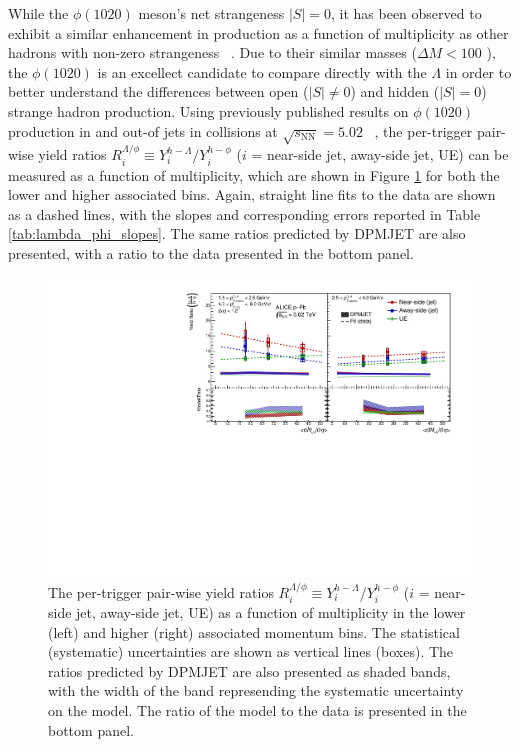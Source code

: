 While the $\phi(1020)$ meson's net strangeness $|S| = 0$, it has been observed to exhibit a similar enhancement in production as a function of multiplicity as other hadrons with non-zero strangeness ~\cite{PhiEnhancement}. Due to their similar masses ($\Delta M < 100$ \MeVmass), the $\phi(1020)$ is an excellect candidate to compare directly with the $\Lambda$ in order to better understand the differences between open ($|S| \neq 0$) and hidden ($|S| = 0$) strange hadron production. Using previously published results on $\phi(1020)$ production in and out-of jets in \pPb collisions at $\sqrt{s_{\text{NN}}} = 5.02$ \TeV ~\cite{JustinPaper}, the per-trigger pair-wise yield ratios $R_{i}^{\Lambda/\phi} \equiv Y_{i}^{h-\Lambda}/Y_{i}^{h-\phi}$ ($i$ = near-side jet, away-side jet, UE) can be measured as a function of multiplicity, which are shown in Figure \ref{fig:lambda_phi_ratio} for both the lower and higher associated \pt bins. Again, straight line fits to the data are shown as a dashed lines, with the slopes and corresponding errors reported in Table \ref{tab:lambda_phi_slopes}. The same ratios predicted by DPMJET are also presented, with a ratio to the data presented in the bottom panel.


\begin{figure}[h!]
\centering
\includegraphics[width=\textwidth]{figures/results/final_lambda_phi_ratio_plot_new_x_axis_model_ratio.pdf}
\caption{The per-trigger pair-wise yield ratios $R_{i}^{\Lambda/\phi} \equiv Y_{i}^{h-\Lambda}$/$Y_{i}^{h-\phi}$ ($i$ = near-side jet, away-side jet, UE) as a function of multiplicity in the lower (left) and higher (right) associated momentum bins. The statistical (systematic) uncertainties are shown as vertical lines (boxes).  The ratios predicted by DPMJET are also presented as shaded bands, with the width of the band represending the systematic uncertainty on the model. The ratio of the model to the data is presented in the bottom panel.}
\label{fig:lambda_phi_ratio}
\end{figure}


